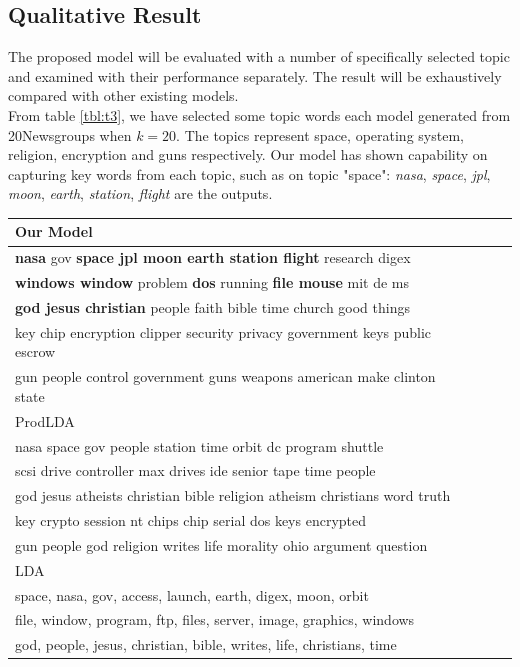 \subsection{Qualitative Result}The proposed model will be evaluated with a number of specifically selected topic and examined with their performance separately. The result will be exhaustively compared with other existing models.\\
From table \ref{tbl:t3}, we have selected some topic words each model generated from 20Newsgroups when $ k=20 $. The topics represent space, operating system, religion, encryption and guns respectively. Our model has shown capability on capturing key words from each topic, such as on topic "space": \textit{nasa}, \textit{space}, \textit{jpl}, \textit{moon}, \textit{earth}, \textit{station}, \textit{flight} are the outputs.
\begin{table}[h]
\centering
\begin{tabular}{llll}
\hline
Our Model  \\ \hline
\textbf{nasa }gov \textbf{space jpl moon earth station flight }research digex\\
\textbf{windows window }problem \textbf{dos }running \textbf{file mouse }mit de ms\\
\textbf{god jesus christian }people faith bible time church good things\\
key chip encryption clipper security privacy government keys public escrow\\
gun people control government guns weapons american make clinton state \\ \hline
\hline
ProdLDA  \\ \hline
nasa space gov people station time orbit dc program shuttle \\
scsi drive controller max drives ide senior tape time people \\
god jesus atheists christian bible religion atheism christians word truth \\
key crypto session nt chips chip serial dos keys encrypted \\
gun people god religion writes life morality ohio argument question \\ \hline
\hline
LDA  \\ \hline
space, nasa, gov, access, launch, earth, digex, moon, orbit\\
file, window, program, ftp, files, server, image, graphics, windows\\
god, people, jesus, christian, bible, writes, life, christians, time\\

\end{tabular}
\end{table}
